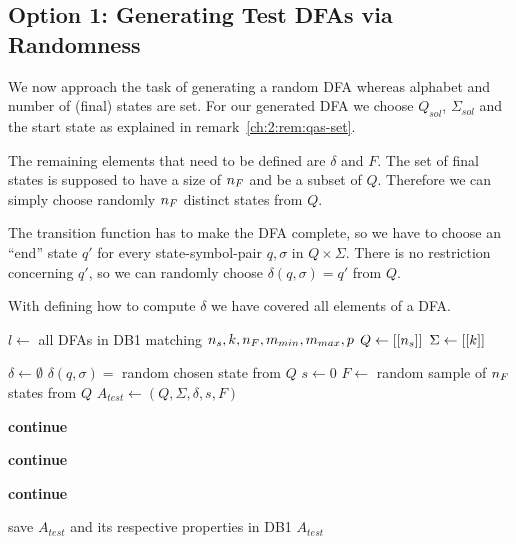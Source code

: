 \subsection{Option 1: Generating Test DFAs via Randomness}

We now approach the task of generating a random DFA whereas alphabet and number of (final) states are set. For our generated DFA we choose $Q_{sol}$, $\Sigma_{sol}$ and the start state as explained in remark~\ref{ch:2:rem:qas-set}.

The remaining elements that need to be defined are $\delta$ and $F$. The set of final states is supposed to have a size of ${n_F}$ and be a subset of $Q$. Therefore we can simply choose randomly ${n_F}$ distinct states from $Q$.

The transition function has to make the DFA complete, so we have to choose an ``end'' state $q'$ for every state-symbol-pair $q,\sigma$ in $Q \times \Sigma$. There is no restriction concerning $q'$, so we can randomly choose $\delta(q, \sigma) = q'$ from $Q$.

With defining how to compute $\delta$ we have covered all elements of a DFA.

\vspace{0.2cm}
\begin{algorithmic}[1]
	
		\vspace{0.2cm}
	
		\State $l \gets$ all DFAs in DB1 matching ${n_s}, k, {n_F}, m_{min}, m_{max}, p$
		\State $Q \gets[[{n_s}]]$
		\State $\Sigma \gets [[k]]$
		
		\vspace{0.2cm}
		
		
		\vspace{0.2cm}
		
			\State $\delta \gets \emptyset$
					\State $\delta(q,\sigma) = $ random chosen state from $Q$
				\EndFor
			\EndFor
			\State $s \gets 0$
			\State $F \gets$ random sample of ${n_F}$ states from $Q$
			\State $A_{test} \gets (Q, \Sigma, \delta, s, F)$
			
			\vspace{0.2cm}
			
			\State \textbf{continue}
			\EndIf
			
			\State \textbf{continue}
			\EndIf
			
			\State \textbf{continue}
			\EndIf
			
			\vspace{0.2cm}
			
			\State save $A_{test}$ and its respective properties in DB1
			\State\Return $A_{test}$
		\EndWhile
	\EndFunction
\end{algorithmic}
\vspace{0.2cm}

